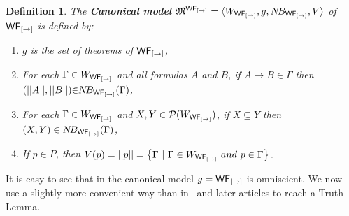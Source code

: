 \documentclass[12pt]{article}
\newtheorem{dfn}[thm]{Definition}
\begin{document}
\begin{dfn}
The \textbf{Canonical model} $\mathfrak{M}^{{\sf WF_{[\rightarrow]}}}=\langle W_{{\sf WF_{[\rightarrow]}}} , g, N\!B_{{\sf WF_{[\rightarrow]}}}, V\rangle$ of ${\sf WF_{[\rightarrow]}}$ is defined by:
\begin{enumerate}
\item $g$ is the set of theorems of ${\sf WF_{[\rightarrow]} }$,
\item For each $ \Gamma \in W_{{\sf WF_{[\rightarrow]}}} $ and all formulas $ A $ and $ B $, if $A\rightarrow B \in \Gamma  $ then $( ||  A||  , ||  B ||  ) {\in} N\!B_{{\sf WF_{[\rightarrow]}}} (\Gamma )$,
\item  For each $ \Gamma \in W_{{\sf WF_{[\rightarrow]}}} $  and $ X, Y \in \mathcal{P}(W_{{\sf WF_{[\rightarrow]}}})  $, if $ X\subseteq Y $ then $(X, Y ) \in  N\!B_{{\sf WF_{[\rightarrow]}}} (\Gamma )$,
\item If $ p\in P$, then $ V(p)= ||  p||   =\left\lbrace \Gamma ~|~\Gamma \in  W_{{\sf WF_{[\rightarrow]}}} ~and~ p \in \Gamma\right\rbrace  .$
\end{enumerate}
\end{dfn}
It is easy to see that in the canonical model $g={\sf WF_{[\rightarrow]}} $ is omniscient. We now use a slightly more convenient way than in~\cite{FD} and later articles to reach a Truth Lemma.
\end{document}

